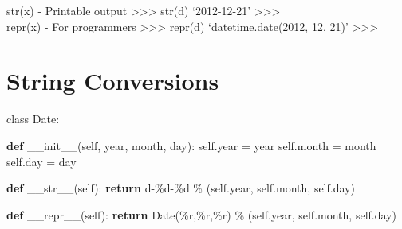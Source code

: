 \documentclass[
  letterpaper,
  DIV=11,
  numbers=noendperiod]{scrreprt}
\newenvironment{Shaded}{\begin{snugshade}}{\end{snugshade}}
\newcommand{\ControlFlowTok}[1]{\textcolor[rgb]{0.00,0.23,0.31}{\textbf{#1}}}
\newcommand{\FunctionTok}[1]{\textcolor[rgb]{0.28,0.35,0.67}{#1}}
\newcommand{\KeywordTok}[1]{\textcolor[rgb]{0.00,0.23,0.31}{\textbf{#1}}}
\newcommand{\NormalTok}[1]{\textcolor[rgb]{0.00,0.23,0.31}{#1}}
\newcommand{\OperatorTok}[1]{\textcolor[rgb]{0.37,0.37,0.37}{#1}}
\newcommand{\SpecialCharTok}[1]{\textcolor[rgb]{0.37,0.37,0.37}{#1}}
\newcommand{\StringTok}[1]{\textcolor[rgb]{0.13,0.47,0.30}{#1}}
\newcommand{\VariableTok}[1]{\textcolor[rgb]{0.07,0.07,0.07}{#1}}
\begin{document}
str(x) - Printable output \textgreater\textgreater\textgreater{} str(d)
`2012-12-21' \textgreater\textgreater\textgreater{}\\
repr(x) - For programmers \textgreater\textgreater\textgreater{} repr(d)
`datetime.date(2012, 12, 21)' \textgreater\textgreater\textgreater{}


\chapter{String Conversions}\label{string-conversions-1}

class Date:

\begin{Shaded}
\begin{Highlighting}[]
\KeywordTok{def} \FunctionTok{\_\_init\_\_}\NormalTok{(}\VariableTok{self}\NormalTok{, year, month, day):}
    \VariableTok{self}\NormalTok{.year }\OperatorTok{=}\NormalTok{ year}
    \VariableTok{self}\NormalTok{.month }\OperatorTok{=}\NormalTok{ month}
    \VariableTok{self}\NormalTok{.day }\OperatorTok{=}\NormalTok{ day }
\end{Highlighting}
\end{Shaded}

\begin{Shaded}
\begin{Highlighting}[]
\KeywordTok{def} \FunctionTok{\_\_str\_\_}\NormalTok{(}\VariableTok{self}\NormalTok{):}
    \ControlFlowTok{return} \StringTok{\textquotesingle{}d{-}}\SpecialCharTok{\%d}\StringTok{{-}}\SpecialCharTok{\%d}\StringTok{\textquotesingle{}} \OperatorTok{\%}\NormalTok{ (}\VariableTok{self}\NormalTok{.year, }\VariableTok{self}\NormalTok{.month, }\VariableTok{self}\NormalTok{.day) }
\end{Highlighting}
\end{Shaded}

\begin{Shaded}
\begin{Highlighting}[]
\KeywordTok{def} \FunctionTok{\_\_repr\_\_}\NormalTok{(}\VariableTok{self}\NormalTok{):}
    \ControlFlowTok{return} \StringTok{\textquotesingle{}Date(}\SpecialCharTok{\%r}\StringTok{,}\SpecialCharTok{\%r}\StringTok{,}\SpecialCharTok{\%r}\StringTok{)\textquotesingle{}} \OperatorTok{\%}\NormalTok{ (}\VariableTok{self}\NormalTok{.year, }\VariableTok{self}\NormalTok{.month, }\VariableTok{self}\NormalTok{.day) }
\end{Highlighting}
\end{Shaded}
\end{document}
